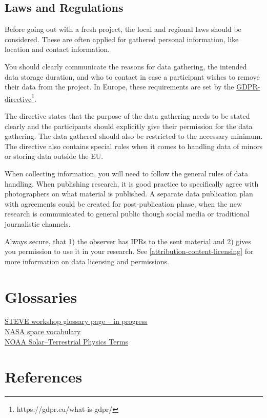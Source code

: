 \documentclass{article}
\begin{document}
\subsection{Laws and Regulations}\label{laws-and-regulations}

Before going out with a fresh project, the local and regional laws should be considered. These are often applied for gathered personal information, like location and contact information.  

You should clearly communicate the reasons for data gathering, the intended data storage duration, and who to contact in case a participant wishes to remove their data from the project. In Europe, these requirements are set by the \href{https://gdpr.eu/what-is-gdpr/}{GDPR-directive}\footnote{https://gdpr.eu/what-is-gdpr/}.

The directive states that the purpose of the data gathering needs to be stated clearly and the participants should explicitly give their permission for the data gathering. The data gathered should also be restricted to the necessary minimum. The directive also contains special rules when it comes to handling data of minors or storing data outside the EU.

When collecting information, you will need to follow the general rules of data handling. When publishing research, it is good practice to specifically agree with photographers on what material is published. A separate data publication plan with agreements could be created for post-publication phase, when the new research is communicated to general public though social media or traditional journalistic channels.  

Always secure, that 1) the observer has IPRs to the sent material and 2) gives you permission to use it in your research. See \ref{attribution-content-licensing} for more information on data licensing and permissions. 



\section{Glossaries}

\href{https://steve-aurora.github.io/glossary/}{STEVE workshop glossary page -- in progress}\\

\noindent\href{https://science.nasa.gov/heliophysics/resources/vocabulary/}{NASA space vocabulary}\\

\noindent\href{https://www.ngdc.noaa.gov/stp/glossary/glossary.html}{NOAA Solar--Terrestrial Physics Terms}\\


\section{References}
% 
%
\printbibliography[heading=none]

\printindex
\end{document}
